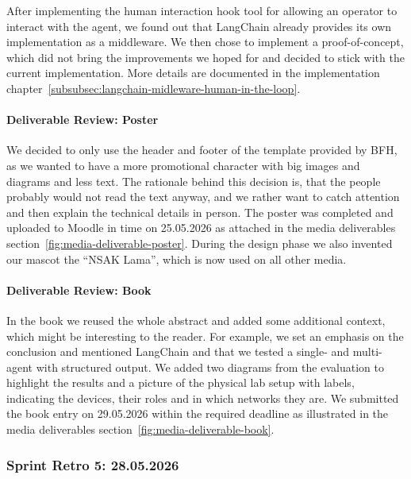 After implementing the human interaction hook tool for allowing an operator to interact with the agent,
we found out that LangChain already provides its own implementation as a middleware.
We then chose to implement a proof-of-concept, which did not bring the improvements we hoped for and decided to stick with the current implementation.
More details are documented in the implementation chapter~\ref{subsubsec:langchain-midleware-human-in-the-loop}.

\paragraph{Deliverable Review: Poster}\label{par:deliverable-review-poster}

We decided to only use the header and footer of the template provided by BFH,
as we wanted to have a more promotional character with big images and diagrams and less text.
The rationale behind this decision is, that the people probably would not read the text anyway,
and we rather want to catch attention and then explain the technical details in person.
The poster was completed and uploaded to Moodle in time on 25.05.2026 as attached in the media deliverables section~\ref{fig:media-deliverable-poster}.
During the design phase we also invented our mascot the \enquote{NSAK Lama}, which is now used on all other media.

\paragraph{Deliverable Review: Book}\label{par:deliverable-review-book}

In the book we reused the whole abstract and added some additional context, which might be interesting to the reader.
For example, we set an emphasis on the conclusion and mentioned LangChain and that we tested a single- and multi-agent with structured output.
We added two diagrams from the evaluation to highlight the results and a picture of the physical lab setup with labels,
indicating the devices, their roles and in which networks they are.
We submitted the book entry on 29.05.2026 within the required deadline as illustrated in the media deliverables section~\ref{fig:media-deliverable-book}.

\subsubsection{Sprint Retro 5: 28.05.2026}\label{subsubsec:sprint-retro-5}

